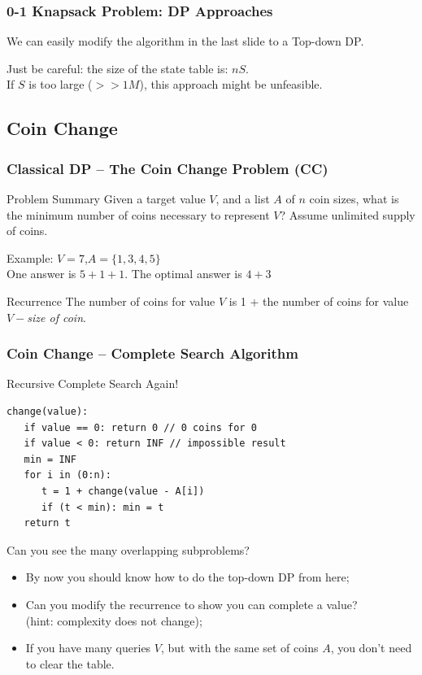 \documentclass{beamer}
\begin{document}
\begin{frame}
  \frametitle{0-1 Knapsack Problem: DP Approaches}

  {\small
    We can easily modify the algorithm in the last slide to a Top-down
    DP.

    \bigskip

    \alert{Just be careful}: the size of the state table is: $nS$.\\
    If $S$ is too large ($>>1M$), this approach might be unfeasible.
  }
\end{frame}

\subsection{Coin Change}
\begin{frame}
  \frametitle{Classical DP -- The Coin Change Problem (CC)}
  \begin{block}{Problem Summary}
    Given a target value $V$, and a list $A$ of $n$ coin sizes, what
    is the minimum number of coins necessary to represent $V$? Assume
    unlimited supply of coins.
  \end{block}

  Example: $V = 7$,$A = \{1,3,4,5\}$\\
  \medskip
  One answer is $5+1+1$. The optimal answer is $4+3$

  \bigskip

  \begin{exampleblock}{Recurrence}
    The number of coins for value $V$ is 1 + the number of coins for
    value $V - $\emph{size of coin}.
  \end{exampleblock}
\end{frame}

\begin{frame}[fragile]
  \frametitle{Coin Change -- Complete Search Algorithm}
  {\smaller
  \begin{block}{Recursive Complete Search Again!}
\begin{verbatim}
change(value):
   if value == 0: return 0 // 0 coins for 0
   if value < 0: return INF // impossible result
   min = INF
   for i in (0:n):
      t = 1 + change(value - A[i])
      if (t < min): min = t
   return t
\end{verbatim}

\medskip

Can you see the many overlapping subproblems?
  \end{block}
\begin{itemize}
  \item By now you should know how to do the top-down DP from here;
  \item Can you modify the recurrence to show  you can complete a value?\\
    (hint: complexity does not change);
  \item If you have many queries $V$, but with the same set of coins
    $A$, you don't need to clear the table.
\end{itemize}


  }
\end{frame}
\end{document}
